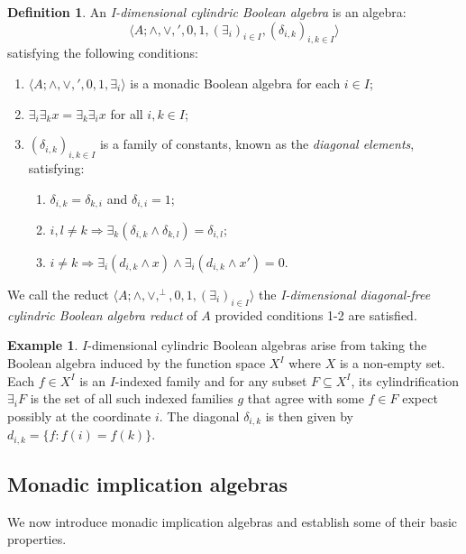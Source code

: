 \documentclass[reqno]{amsart}
\theoremstyle{plain}
\theoremstyle{definition}
\newtheorem{definition}[theorem]{Definition}
\newtheorem{example}[theorem]{Example}
\begin{document}
\begin{definition}\label{quantum cylindric algebra}
    An \emph{I-dimensional cylindric Boolean algebra} is an algebra: \[\langle A;\wedge,\vee,',0,1,(\exists_i)_{i\in I},(\delta_{i,k})_{i,k\in I}\rangle\] satisfying the following conditions: 
    \begin{enumerate}
    \item $\langle A;\wedge,\vee,',0,1,\exists_i\rangle$ is a monadic Boolean algebra for each $i\in I$; 
        \item $\exists_i\exists_kx=\exists_k\exists_ix$ for all $i,k\in I$; 
        \item $(\delta_{i,k})_{i,k\in I}$ is a family of constants, known as the \emph{diagonal elements}, satisfying: 
            \begin{enumerate}
        \item $\delta_{i,k}=\delta_{k,i}$ and $\delta_{i,i}=1$;
        \item $i,l\not=k\Rightarrow\exists_{k}(\delta_{i,k}\wedge \delta_{k,l})=\delta_{i,l}$; 
        \item $i\not=k\Rightarrow\exists_i(d_{i,k}\wedge x)\wedge\exists_i(d_{i,k}\wedge x')=0$. 
    \end{enumerate}
    \end{enumerate}
    We call the reduct $\langle A;\wedge,\vee,^{\perp},0,1,(\exists_{i})_{i\in I}\rangle$ the \emph{I-dimensional diagonal-free cylindric Boolean algebra reduct} of $A$ provided conditions 1-2 are satisfied.   
\end{definition}
\begin{example}
     $I$-dimensional cylindric Boolean algebras arise from taking the Boolean algebra induced by the function space $X^I$ where $X$ is a non-empty set. Each $f\in X^I$ is an $I$-indexed family and for any subset $F\subseteq X^I$, its cylindrification $\exists_iF$ is the set of all such indexed families $g$ that agree with some $f\in F$ expect possibly at the coordinate $i$. The diagonal $\delta_{i,k}$ is then given by $d_{i,k}=\{f:f(i)=f(k)\}$.  
\end{example}


\subsection{Monadic implication algebras} We now introduce monadic implication algebras and establish some of their basic properties. 
\end{document}
